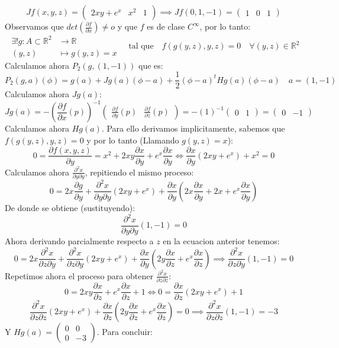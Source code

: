 \documentclass{article}
\newcommand\pdv[2]{\frac{\partial#1}{\partial#2}}
\begin{document}
\[
Jf(x, y, z) = 
\begin{pmatrix}
2xy + e^x & x^2 & 1
\end{pmatrix}
\implies
Jf(0,1,-1) =
\begin{pmatrix}
1 & 0 & 1
\end{pmatrix}
\]
Observamos que $det(\frac{\partial f}{\partial x}) \neq o$ y que $f$ es de clase $C^\infty$, por lo tanto:
\[
\begin{aligned}
	\exists  ! g \colon A \subset \mathbb{R}^2 &\to \mathbb{R} \\
	(y, z) &\mapsto g(y, z) = x
\end{aligned}
\quad \text{tal que}
\quad
f(g(y, z), y, z) = 0 \quad \forall (y, z) \in \mathbb{R}^2
\]
Calculamos ahora $P_2(g, (1,-1))$ que es:
\[
P_2(g, a)(\phi) = g(a) + Jg(a)(\phi - a) + \frac{1}{2}(\phi - a)^tHg(a)(\phi-a) \quad a = (1,-1)
\]
Calculamos ahora $Jg(a)$:
\[
Jg(a) = -\left(\pdv{f}{x}(p) \right)^{-1} \begin{pmatrix} \pdv{f}{y}(p) & \pdv{f}{z}(p) \end{pmatrix}
=
-(1)^{-1} \begin{pmatrix} 0 & 1 \end{pmatrix} = \begin{pmatrix} 0 & -1 \end{pmatrix}
\]
Calculamos ahora $Hg(a)$. Para ello derivamos implicitamente, sabemos que $f(g(y, z), y, z) = 0$
y por lo tanto (Llamando $g(y, z) = x$):
\[
0 = \pdv{f(x, y, z)}{y} = x^2 + 2xy\pdv{x}{y} + e^x\pdv{x}{y}
\iff
\pdv{x}{y}\left( 2xy + e^x \right) + x^2 = 0
\]
Calculamos ahora $\pdv{^2x}{y \partial y}$, repitiendo el mismo proceso:
\[
0 = 2x\pdv{g}{y} +
\pdv{^2x}{y \partial y} \left( 2xy + e^x \right) + \pdv{x}{y} \left( 2x\pdv{x}{y} + 2x + e^x \pdv{x}{y} \right)
\]
De donde se obtiene (sustituyendo):
\[
\pdv{^2x}{y \partial y}(1,-1) = 0
\]
Ahora derivando parcialmente respecto a $z$ en la ecuacion anterior tenemos:
 \[
 0 = 2x\pdv{^2x}{z \partial y} + \pdv{^2x}{z \partial y} \left( 2xy +e^x \right) +
 \pdv{x}{y} \left( 2y \pdv{x}{z} + e^x \pdv{x}{z} \right)
 \implies
 \pdv{^2x}{z \partial y}(1,-1) = 0
 \]
 Repetimos ahora el proceso para obtener $\pdv{^2x}{z \partial z}$:
 \[
 0 = 2xy \pdv{x}{z} + e^x\pdv{x}{z} + 1
 \iff
 0 = \pdv{x}{z} \left(2xy + e^x \right) +1
 \]
 \[
 \pdv{^2x}{z \partial z} \left( 2xy + e^x \right) + \pdv{x}{z} \left( 2y\pdv{x}{z} + e^x \pdv{x}{z} \right) = 0
 \implies
 \pdv{^2x}{z \partial z}(1,-1) = -3
 \]
Y $Hg(a) = \begin{pmatrix} 0 & 0 \\ 0& -3 \end{pmatrix}$. Para concluir:
\end{document}
